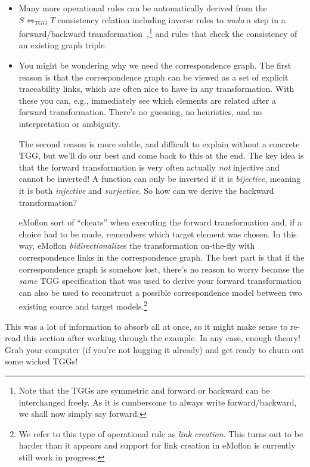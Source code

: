 \begin{itemize}

\item Many more operational rules can be automatically derived from the $S \Leftrightarrow_{TGG} T$ consistency relation including inverse rules to \emph{undo} a step in a forward/backward transformation~\cite{LAVS_ICGT_2012},\footnote{Note that the TGGs are symmetric and forward or backward can be interchanged freely. 
As it is cumbersome to always write forward/backward, we shall now simply say forward.} and rules that check the consistency of an existing graph triple.

\item You might be wondering why we need the correspondence graph. 
The first reason is that the correspondence graph can be viewed as a set of explicit traceability links, which are often nice to have in any transformation. 
With these you can, e.g., immediately see which elements are related after a forward transformation. 
There's no guessing, no heuristics, and no interpretation or ambiguity.

\vspace{0.25cm}

The second reason is more subtle, and difficult to explain without a concrete TGG, but we'll do our best and come back to this at the end. 
The key idea is that the forward transformation is very often actually \emph{not} injective and cannot be inverted! 
A function can only be inverted if it is \emph{bijective}, meaning it is both \emph{injective} and \emph{surjective}. 
So how can we derive the backward transformation?

\vspace{0.25cm}

eMoflon sort of ``cheats'' when executing the forward transformation and, if a choice had to be made, remembers which target element was chosen. 
In this way, eMoflon \emph{bidirectionalize}s the transformation on-the-fly with correspondence links in the correspondence graph. 
The best part is that if the correspondence graph is somehow lost, there's no reason to worry because the \emph{same} TGG specification that was used to derive your forward transformation
can also be used to reconstruct a possible correspondence model between two existing source and target models.\footnote{We refer to this type of operational rule as \emph{link creation}. 
This turns out to be harder than it appears and support for link creation in eMoflon is currently still work in progress.}

\end{itemize}
This was a lot of information to absorb all at once, so it might make sense to re-read this section after working through the example.
In any case, enough theory! 
Grab your computer (if you're not hugging it already) and get ready to churn out some wicked TGGs!
